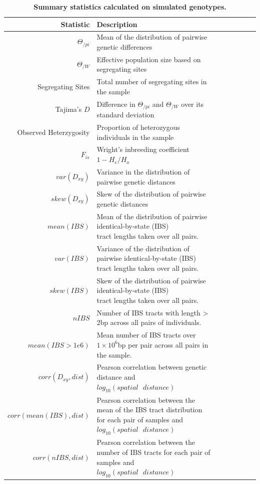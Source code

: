 \documentclass[11pt,twoside,lineno]{preprint}
\begin{document}
\begin{table}
\small
\centering
\caption{\bf Summary statistics calculated on simulated genotypes.}
\begin{tabular}{rllrrrrr}
  \hline
Statistic & Description \\ 
  \hline
$\Theta_{/pi}$ & Mean of the distribution of pairwise genetic differences \\
$\Theta_{/W}$ & Effective population size based on segregating sites \\
Segregating Sites & Total number of segregating sites in the sample \\
Tajima's $D$ & Difference in $\Theta_{/pi}$ and $\Theta_{/W}$ over its standard deviation\\
Observed Heterzygosity & Proportion of heterozygous individuals in the sample \\
$F_{is}$ & Wright's inbreeding coefficient $1-H_{e}/H_{o}$ \\
$var(D_{xy})$ & Variance in the distribution of pairwise genetic distances \\
$skew(D_{xy})$ & Skew of the distribution of pairwise genetic distances \\
$mean(IBS)$ & \makecell[l]{Mean of the distribution of pairwise identical-by-state (IBS) \\tract lengths taken over all pairs.} \\
$var(IBS)$ & \makecell[l]{Variance of the distribution of pairwise identical-by-state (IBS) \\tract lengths taken over all pairs.} \\
$skew(IBS)$ & \makecell[l]{Skew of the distribution of pairwise identical-by-state (IBS) \\tract lengths taken over all pairs.} \\
$nIBS$ & Number of IBS tracts with length > 2bp across all pairs of individuals. \\
$mean(IBS>1e6)$ & \makecell[l]{Mean number of IBS tracts over $1\times10^6$bp per pair \\across all pairs in the sample.} \\ 
$corr(D_{xy},dist)$ & Pearson correlation between genetic distance and $log_{10}(spatial\text{ }distance)$ \\
$corr(mean(IBS),dist)$ & \makecell[l]{Pearson correlation between the mean of the IBS tract distribution \\for each pair of samples and $log_{10}(spatial\text{ }distance)$} \\
$corr(nIBS,dist)$ & \makecell[l]{Pearson correlation between the number of IBS tracts \\for each pair of samples and $log_{10}(spatial\text{ }distance)$} \\

\end{tabular}
\end{table}
\end{document}
